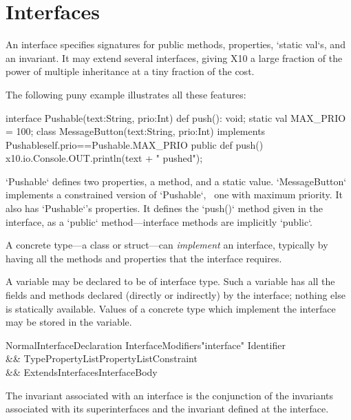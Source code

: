 \chapter{Interfaces}
\label{XtenInterfaces}

An interface specifies signatures for public methods, properties,
\xcd`static val`s, and an invariant. It may extend several interfaces, giving
X10 a large fraction of the power of multiple inheritance at a tiny fraction
of the cost.

The following puny example illustrates all these features: 
%
\begin{xten}
interface Pushable(text:String, prio:Int) {
  def push(): void;
  static val MAX_PRIO = 100;
}
class MessageButton(text:String, prio:Int) 
  implements Pushable{self.prio==Pushable.MAX_PRIO} {
  public def push() { 
    x10.io.Console.OUT.println(text + " pushed");
  }
}
\end{xten}
%
\noindent
\xcd`Pushable` defines two properties, a method, and a static value.  
\xcd`MessageButton` implements a constrained version of \xcd`Pushable`,
\viz\ one with maximum priority.  It also has \xcd`Pushable`'s properties.  It
defines the \xcd`push()` method given in the interface, as a \xcd`public`
method---interface methods are implicitly \xcd`public`.

A concrete type---a class or struct---can {\em implement} an interface,
typically by having all the methods and properties that the interface
requires.

A variable may be declared to be of interface type.  Such a variable has all
the fields and methods declared (directly or indirectly) by the interface;
nothing else is statically available.  Values of a concrete type which
implement the interface may be stored in the variable.  


\label{DepType:Interface}


\begin{grammar}
NormalInterfaceDeclaration \:
      InterfaceModifiers\opt \xcd"interface" Identifier  \\
   && TypePropertyList\opt PropertyList\opt Constraint\opt \\
   && ExtendsInterfaces\opt InterfaceBody \\
\end{grammar}
\noindent
The invariant associated with an interface is the conjunction of the
invariants associated with its superinterfaces and the invariant
defined at the interface. 

